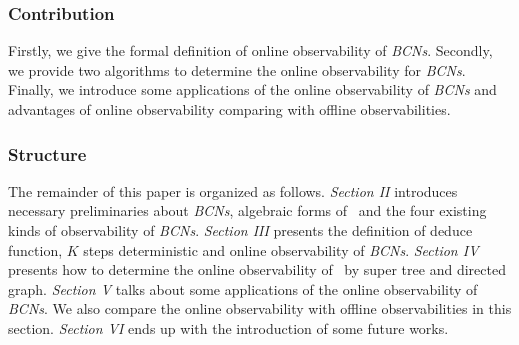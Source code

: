 \subsubsection*{Contribution}
Firstly, we give the formal definition of online observability of {\em BCNs}. Secondly, we provide two algorithms to determine the online observability for {\em BCNs}. Finally, we introduce some applications of the online observability of {\em BCNs} and advantages of online observability comparing with offline observabilities. %
\subsubsection*{Structure}
The remainder of this paper is organized as follows. {\em Section II} introduces necessary preliminaries about {\em BCNs}, algebraic forms of \BCNs\ and the four existing kinds of observability of {\em BCNs}. {\em Section III} presents the definition of deduce function, $K$ steps deterministic and online observability of {\em BCNs}. {\em Section IV} presents how to determine the online observability of \BCNs\ by super tree and directed graph. {\em Section V} talks about some applications of the online observability of {\em BCNs}. We also compare the online observability with offline observabilities in this section. {\em Section VI} ends up  with the introduction of some future works.


